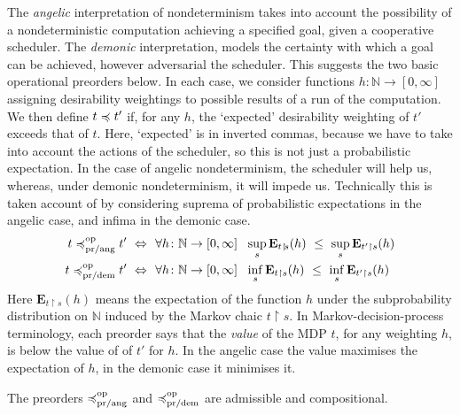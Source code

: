 The  \emph{angelic} interpretation of nondeterminism takes into account the possibility of a nondeterministic computation achieving a specified goal, given a cooperative scheduler.  The  \emph{demonic} interpretation, 
models the {certainty} with which a goal can be achieved, however adversarial the scheduler. 
This suggests the  two  basic operational preorders below. 
In each case, we consider functions $h \colon \mathbb{N} \to [0,\infty]$ assigning desirability weightings to possible results of a run of the computation. We then define 
$t \preccurlyeq t'$ if, for any $h$, the `expected' desirability weighting of $t'$ exceeds that of $t$. Here, `expected' is in inverted commas, because we have to take into account the actions of the scheduler, so this is not just a probabilistic expectation. In the case of 
angelic nondeterminism, the scheduler will help us, whereas, under demonic nondeterminism, it will impede us.
Technically this is taken account of by considering suprema of probabilistic expectations in the angelic case, and infima in the demonic case.
\begin{align*}
t \preccurlyeq^{\text{op}}_{\text{pr/ang}} t' ~ \Leftrightarrow ~ ~& \forall h \colon \mathbb{N} \to [0,\infty]~~ \sup_s  \mathbf{E}_{t\restriction\!s} (h)~ \leq~ \sup_s \mathbf{E}_{t'\restriction s} (h)
\\
t \preccurlyeq^{\text{op}}_{\text{pr/dem}} t' ~ \Leftrightarrow ~ ~& \forall h \colon \mathbb{N} \to [0,\infty]~~ \inf_s  \mathbf{E}_{t\restriction s} (h)~ \leq~ \inf_s \mathbf{E}_{t'\restriction s} (h)
\end{align*}
Here $\mathbf{E}_{t\restriction\!s} (h)$ means the expectation of the function $h$ under the subprobability distribution on $\mathbb{N}$ induced by the Markov chaic $t  \restriction\! s$.
In Markov-decision-process terminology, each preorder says that the \emph{value} of the MDP $t$, for any weighting $h$, is below the value of of $t'$ for $h$. In the angelic case the value maximises the expectation of $h$, in the demonic case it minimises it. 
\begin{proposition}
The preorders $\preccurlyeq^{\text{op}}_{\text{pr/ang}}$ and $\preccurlyeq^{\text{op}}_{\text{pr/dem}}$ are admissible and compositional.
\end{proposition}


